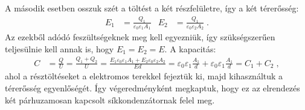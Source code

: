 A második esetben osszuk szét a töltést a két részfelületre, így a két térerősség:
\begin{align}
 E_1 &= \frac{Q_1}{\varepsilon_0\varepsilon_1A_1} &
 E_2 &= \frac{Q_1}{\varepsilon_0\varepsilon_2A_2}\;. 
\end{align}
Az ezekből adódó feszültségeknek meg kell egyezniük, így szükségszerűen teljesülnie kell annak is, hogy $E_1=E_2=E$.  A kapacitás:
 \begin{align}
  C &= \frac{Q}{U} 
     = \frac{Q_1+Q_2}{U}
     = \frac{E_1\varepsilon_0\varepsilon_1A_1 + E_2\varepsilon_0\varepsilon_2A_2}{Ed}
     = \varepsilon_0\varepsilon_1\frac{A_1}{d} + \varepsilon_0\varepsilon_1\frac{A_1}{d}
     = C_1+C_2\;,
 \end{align}
 ahol a résztöltéseket a elektromos terekkel fejeztük ki, majd kihasználtuk a térerősség egyenlőségét. Így végeredményként megkaptuk, hogy ez az elrendezés két párhuzamosan kapcsolt síkkondenzátornak felel meg.
 
% 
 
\fi